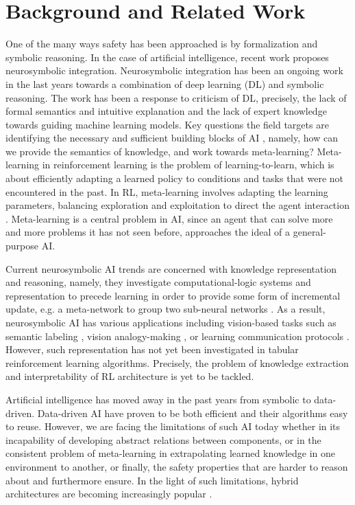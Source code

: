 \documentclass[a4paper,11pt]{article}
\begin{document}
\section{Background and Related Work}
One of the many ways safety has been approached is by formalization and symbolic reasoning. 
In the case of artificial intelligence, recent work proposes neurosymbolic integration. 
Neurosymbolic integration has been an ongoing work in the last years towards a combination of deep learning (DL) and symbolic reasoning.
The work has been a response to criticism of DL, precisely, the lack of formal semantics and intuitive explanation and the lack of expert knowledge towards guiding machine learning models. 
Key questions the field targets are identifying the necessary and sufficient building blocks of AI \cite{garcez2020neurosymbolic}, namely, how can we provide the semantics of knowledge, 
and work towards meta-learning? Meta-learning in reinforcement learning is the problem of learning-to-learn, which is about efficiently
adapting a learned policy to conditions and tasks that were not encountered in the past. In RL, meta-learning
involves adapting the learning parameters, balancing exploration and exploitation to direct the
agent interaction \cite{gupta_meta-reinforcement_2018,schweighofer_meta-learning_2003}. Meta-learning is a central problem in AI, since an agent that can solve more
and more problems it has not seen before, approaches the ideal of a general-purpose AI. 

\medskip

Current neurosymbolic AI trends are concerned with knowledge representation and reasoning, namely, they investigate computational-logic systems 
and representation to precede learning in order to provide some form of incremental update, e.g. a meta-network to group two sub-neural networks \cite{Besold2017NeuralSymbolicLA}.
As a result, neurosymbolic AI has various applications including vision-based tasks such as semantic labeling \cite{vinyals2015, karpathy2015}, 
vision analogy-making \cite{Reed2015DeepVA}, or learning communication protocols \cite{Foerster2016LearningTC}.
However, such representation has not yet been investigated in tabular reinforcement learning algorithms. Precisely, the problem of knowledge extraction and interpretability of RL architecture is yet to be tackled.

\medskip

Artificial intelligence has moved away in the past years from symbolic to data-driven. 
Data-driven AI have proven to be both efficient and their algorithms easy to reuse. However, 
we are facing the limitations of such AI today whether 
in its incapability of developing abstract relations between components, or in the consistent problem of meta-learning in extrapolating learned knowledge 
in one environment to another, or finally, the safety properties that are harder to reason about and furthermore ensure. 
In the light of such limitations, hybrid architectures are becoming increasingly popular \cite{garcez2020neurosymbolic}. 
\end{document}
